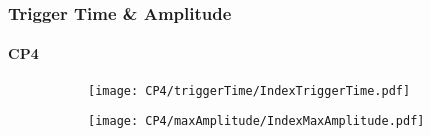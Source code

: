 \documentclass{beamer}
\begin{document}
\begin{frame}
\frametitle{Trigger Time \& Amplitude}
\framesubtitle{CP4}

\begin{figure}

\begin{subfigure}{.5\textwidth}
	\centering
	\texttt{[image: CP4/triggerTime/IndexTriggerTime.pdf]}
\end{subfigure}%
\begin{subfigure}{.5\textwidth}
	\centering
	\texttt{[image: CP4/maxAmplitude/IndexMaxAmplitude.pdf]}
\end{subfigure}
\end{figure}

\end{frame}
\end{document}
